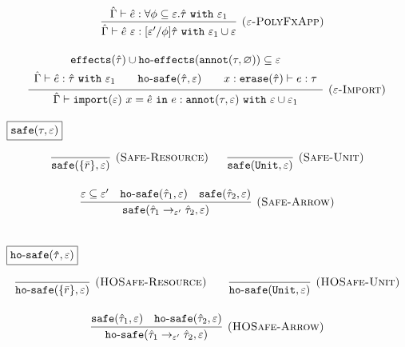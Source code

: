 \documentclass{llncs}
\newcommand{\keywadj}[1]{\mathtt{#1}}
\newcommand{\keyw}[1]{\keywadj{#1}~}
\newcommand{\kw}[1]{\keyw{ #1 }}
\newcommand{\kwa}[1]{\keywadj{ #1 }}
\newcommand{\hyphen}{\hbox{-}}
\newcommand{\hofx}[1]{ \kwa{ho \hyphen effects}(#1) }
\newcommand{\annot}[2]{
	\keywadj{annot}(#1, #2)
}
\begin{document}
\[\begin{array}{c}
~~~

\infer[\textsc{($\varepsilon$-PolyFxApp)}]
	{ \hat \Gamma \vdash \hat e~\varepsilon : [\varepsilon'/\phi]\hat \tau~\kw{with} \varepsilon_1 \cup \varepsilon }
	{ \hat \Gamma \vdash \hat e: \forall \phi \subseteq \varepsilon. \hat \tau~\kw{with} \varepsilon_1 } \\[2ex]

\infer[\textsc{($\varepsilon$-Import)}]
	{ \hat \Gamma \vdash \kwa{import}(\varepsilon)~x = \hat e~\kw{in} e: \kwa{annot}(\tau, \varepsilon)~\kw{with} \varepsilon \cup \varepsilon_1 }
{{\def\arraystretch{1.4}
  \begin{array}{c}
\kwa{effects}(\hat \tau) \cup \hofx{\annot{\tau}{\varnothing}}\subseteq \varepsilon \\
\hat \Gamma \vdash \hat e: \hat \tau~\kw{with} \varepsilon_1 ~~~~~~ \kwa{ho \hyphen safe}(\hat \tau, \varepsilon) ~~~~~~ x: \kwa{erase}(\hat \tau) \vdash e: \tau
  \end{array}}} 
 
 
\end{array}
\]

\noindent
$\fbox{$\kwa{safe(\tau, \varepsilon)}$}$

\[
\begin{array}{c}

\infer[\textsc{(Safe-Resource)}]
	{\kwa{safe}(\{ \bar r \}, \varepsilon)}
	{}
~~~~~
\infer[\textsc{(Safe-Unit)}]
	{\kwa{safe}(\kwa{Unit}, \varepsilon)}
	{} \\[3ex]

\infer[\textsc{(Safe-Arrow)}]
	{\kwa{safe}(\hat \tau_1 \rightarrow_{\varepsilon'} \hat \tau_2, \varepsilon)}
	{\varepsilon \subseteq \varepsilon' & \kwa{ho \hyphen safe}(\hat \tau_1, \varepsilon) & \kwa{safe}(\hat \tau_2, \varepsilon)} \\[3ex]

\end{array}
\]

\noindent
$\fbox{$\kwa{ho \hyphen safe(\hat \tau, \varepsilon)}$}$

\[
\begin{array}{c}

\infer[\textsc{(HOSafe-Resource)}]
	{ \kwa{ho \hyphen safe}( \{ \bar r \}, \varepsilon)} 
	{}
	~~~~~~
\infer[\textsc{(HOSafe-Unit)}]
	{ \kwa{ho \hyphen safe}( \kwa{Unit}, \varepsilon)} 
	{}\\[3ex]

\infer[\textsc{(HOSafe-Arrow)}]
	{ \kwa{ho \hyphen safe}( \hat \tau_1 \rightarrow_{\varepsilon'} \hat \tau_2, \varepsilon ) }
	{ \kwa{safe}(\hat \tau_1, \varepsilon)  & \kwa{ho \hyphen safe}(\hat \tau_2, \varepsilon) }\\[3ex]

\end{array}
\]
\end{document}
